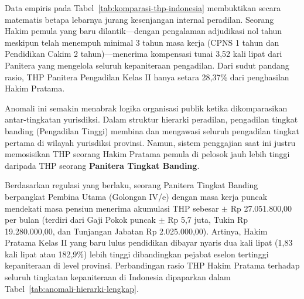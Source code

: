 \documentclass[12pt, a4paper]{article}
\begin{document}
Data empiris pada Tabel~\ref{tab:komparasi-thp-indonesia} membuktikan secara matematis betapa lebarnya jurang kesenjangan internal peradilan. Seorang Hakim pemula yang baru dilantik---dengan pengalaman adjudikasi nol tahun meskipun telah menempuh minimal 3 tahun masa kerja (CPNS 1 tahun dan Pendidikan Cakim 2 tahun)---menerima kompensasi tunai 3,52 kali lipat dari Panitera yang mengelola seluruh kepaniteraan pengadilan. Dari sudut pandang rasio, THP Panitera Pengadilan Kelas II hanya setara 28,37\% dari penghasilan Hakim Pratama.

Anomali ini semakin menabrak logika organisasi publik ketika dikomparasikan antar-tingkatan yurisdiksi. Dalam struktur hierarki peradilan, pengadilan tingkat banding (Pengadilan Tinggi) membina dan mengawasi seluruh pengadilan tingkat pertama di wilayah yurisdiksi provinsi. Namun, sistem penggajian saat ini justru memosisikan THP seorang Hakim Pratama pemula di pelosok jauh lebih tinggi daripada THP seorang \textbf{Panitera Tingkat Banding}. 

Berdasarkan regulasi yang berlaku, seorang Panitera Tingkat Banding berpangkat Pembina Utama (Golongan IV/e) dengan masa kerja puncak mendekati masa pensiun menerima akumulasi THP sebesar $\pm$ Rp 27.051.800,00 per bulan (terdiri dari Gaji Pokok puncak $\pm$ Rp 5,7 juta, Tukin Rp 19.280.000,00, dan Tunjangan Jabatan Rp 2.025.000,00). Artinya, Hakim Pratama Kelas II yang baru lulus pendidikan dibayar nyaris dua kali lipat (1,83 kali lipat atau 182,9\%) lebih tinggi dibandingkan pejabat eselon tertinggi kepaniteraan di level provinsi. Perbandingan rasio THP Hakim Pratama terhadap seluruh tingkatan kepaniteraan di Indonesia dipaparkan dalam Tabel~\ref{tab:anomali-hierarki-lengkap}.
\end{document}
